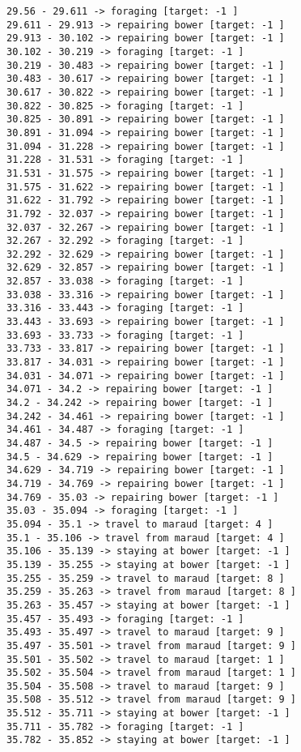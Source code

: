 \documentclass[11pt]{article}
\begin{document}
\begin{Verbatim}[commandchars=\\\{\}]
29.56 - 29.611 -> foraging [target: -1 ]
29.611 - 29.913 -> repairing bower [target: -1 ]
29.913 - 30.102 -> repairing bower [target: -1 ]
30.102 - 30.219 -> foraging [target: -1 ]
30.219 - 30.483 -> repairing bower [target: -1 ]
30.483 - 30.617 -> repairing bower [target: -1 ]
30.617 - 30.822 -> repairing bower [target: -1 ]
30.822 - 30.825 -> foraging [target: -1 ]
30.825 - 30.891 -> repairing bower [target: -1 ]
30.891 - 31.094 -> repairing bower [target: -1 ]
31.094 - 31.228 -> repairing bower [target: -1 ]
31.228 - 31.531 -> foraging [target: -1 ]
31.531 - 31.575 -> repairing bower [target: -1 ]
31.575 - 31.622 -> repairing bower [target: -1 ]
31.622 - 31.792 -> repairing bower [target: -1 ]
31.792 - 32.037 -> repairing bower [target: -1 ]
32.037 - 32.267 -> repairing bower [target: -1 ]
32.267 - 32.292 -> foraging [target: -1 ]
32.292 - 32.629 -> repairing bower [target: -1 ]
32.629 - 32.857 -> repairing bower [target: -1 ]
32.857 - 33.038 -> foraging [target: -1 ]
33.038 - 33.316 -> repairing bower [target: -1 ]
33.316 - 33.443 -> foraging [target: -1 ]
33.443 - 33.693 -> repairing bower [target: -1 ]
33.693 - 33.733 -> foraging [target: -1 ]
33.733 - 33.817 -> repairing bower [target: -1 ]
33.817 - 34.031 -> repairing bower [target: -1 ]
34.031 - 34.071 -> repairing bower [target: -1 ]
34.071 - 34.2 -> repairing bower [target: -1 ]
34.2 - 34.242 -> repairing bower [target: -1 ]
34.242 - 34.461 -> repairing bower [target: -1 ]
34.461 - 34.487 -> foraging [target: -1 ]
34.487 - 34.5 -> repairing bower [target: -1 ]
34.5 - 34.629 -> repairing bower [target: -1 ]
34.629 - 34.719 -> repairing bower [target: -1 ]
34.719 - 34.769 -> repairing bower [target: -1 ]
34.769 - 35.03 -> repairing bower [target: -1 ]
35.03 - 35.094 -> foraging [target: -1 ]
35.094 - 35.1 -> travel to maraud [target: 4 ]
35.1 - 35.106 -> travel from maraud [target: 4 ]
35.106 - 35.139 -> staying at bower [target: -1 ]
35.139 - 35.255 -> staying at bower [target: -1 ]
35.255 - 35.259 -> travel to maraud [target: 8 ]
35.259 - 35.263 -> travel from maraud [target: 8 ]
35.263 - 35.457 -> staying at bower [target: -1 ]
35.457 - 35.493 -> foraging [target: -1 ]
35.493 - 35.497 -> travel to maraud [target: 9 ]
35.497 - 35.501 -> travel from maraud [target: 9 ]
35.501 - 35.502 -> travel to maraud [target: 1 ]
35.502 - 35.504 -> travel from maraud [target: 1 ]
35.504 - 35.508 -> travel to maraud [target: 9 ]
35.508 - 35.512 -> travel from maraud [target: 9 ]
35.512 - 35.711 -> staying at bower [target: -1 ]
35.711 - 35.782 -> foraging [target: -1 ]
35.782 - 35.852 -> staying at bower [target: -1 ]

\end{Verbatim}
\end{document}
